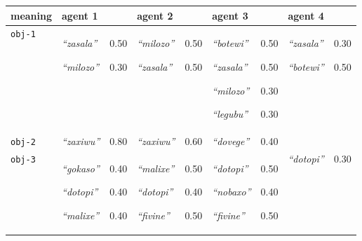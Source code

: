 
{\footnotesize\renewcommand{\arraystretch}{1.5}
\begin{tabular}{@{}p{1.2cm}|p{1.6cm}@{}p{0.8cm}@{}|p{1.6cm}@{}p{0.8cm}@{}|p{1.6cm}@{}p{0.8cm}@{}|p{1.6cm}@{}p{0.8cm}@{}}
meaning & agent 1 &  & agent 2 &  & agent 3 &  & agent 4 & \\
\hline
\texttt{obj-1}&\textit{``zasala''}


\textit{``milozo''}
&0.50

0.30&\textit{``milozo''}


\textit{``zasala''}
&0.50

0.50&\textit{``botewi''}


\textit{``zasala''}


\textit{``milozo''}


\textit{``legubu''}
&0.50

0.50

0.30

0.30&\textit{``zasala''}


\textit{``botewi''}
&0.30

0.50\\
\hline
\texttt{obj-2}&\textit{``zaxiwu''}
&0.80&\textit{``zaxiwu''}
&0.60&\textit{``dovege''}
&0.40&&\\
\hline
\texttt{obj-3}&\textit{``gokaso''}


\textit{``dotopi''}


\textit{``malixe''}
&0.40

0.40

0.40&\textit{``malixe''}


\textit{``dotopi''}


\textit{``fivine''}
&0.50

0.40

0.50&\textit{``dotopi''}


\textit{``nobaxo''}


\textit{``fivine''}
&0.50

0.40

0.50&\textit{``dotopi''}
&0.30
\end{tabular}}

